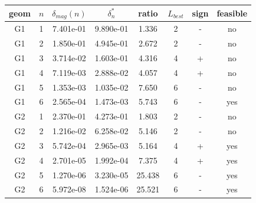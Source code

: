 \begin{tabular}{cc|ccc|ccc}
\hline
geom & $n$ & $\delta_{mag}(n)$ & $\delta^*_n$ & ratio & $L_{best}$ & sign & feasible \\
\hline
G1 & 1 & 7.401e-01 & 9.890e-01 & 1.336 & 2 & - & no \\
G1 & 2 & 1.850e-01 & 4.945e-01 & 2.672 & 2 & - & no \\
G1 & 3 & 3.714e-02 & 1.603e-01 & 4.316 & 4 & + & no \\
G1 & 4 & 7.119e-03 & 2.888e-02 & 4.057 & 4 & + & no \\
G1 & 5 & 1.353e-03 & 1.035e-02 & 7.650 & 6 & - & no \\
G1 & 6 & 2.565e-04 & 1.473e-03 & 5.743 & 6 & - & yes \\
G2 & 1 & 2.370e-01 & 4.273e-01 & 1.803 & 2 & - & no \\
G2 & 2 & 1.216e-02 & 6.258e-02 & 5.146 & 2 & - & no \\
G2 & 3 & 5.742e-04 & 2.965e-03 & 5.164 & 4 & + & yes \\
G2 & 4 & 2.701e-05 & 1.992e-04 & 7.375 & 4 & + & yes \\
G2 & 5 & 1.270e-06 & 3.230e-05 & 25.438 & 6 & - & yes \\
G2 & 6 & 5.972e-08 & 1.524e-06 & 25.521 & 6 & - & yes \\
\hline
\end{tabular}